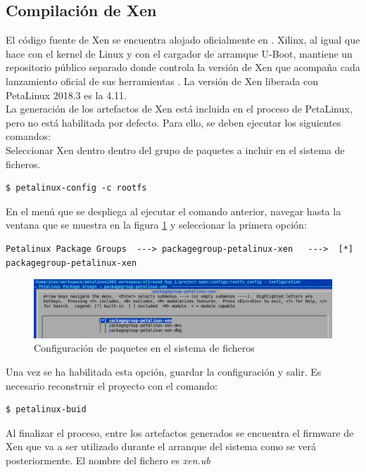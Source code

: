 \subsection{Compilación de Xen} \label{xen_compilacion}

El código fuente de Xen se encuentra alojado oficialmente en \cite{xen_source}. Xilinx, al igual que hace con el kernel de Linux y con el cargador de arramque U-Boot, mantiene un repositorio público separado donde controla la versión de Xen que acompaña cada lanzamiento oficial de sus herramientas \cite{xen_source_xilinx}. La versión de Xen liberada con PetaLinux 2018.3 es la 4.11.\\
La generación de los artefactos de Xen está incluida en el proceso de PetaLinux, pero no está habilitada por defecto. Para ello, se deben ejecutar los siguientes comandos:\\
Seleccionar Xen dentro dentro del grupo de paquetes a incluir en el sistema de ficheros.
\begin{lstlisting}[style=CStyle]
$ petalinux-config -c rootfs
\end{lstlisting}

En el menú que se despliega al ejecutar el comando anterior, navegar hasta la ventana que se muestra en la figura \ref{fig:xen_menuconfig_1} y seleccionar la primera opción:
\begin{lstlisting}[style=CStyle]
Petalinux Package Groups  ---> packagegroup-petalinux-xen   --->  [*] packagegroup-petalinux-xen
\end{lstlisting}

\begin{figure}[!h]
  \centering
  \includegraphics[width=1.0\textwidth]{recursos/petalinux_xen_1.png}
  \caption{Configuración de paquetes en el sistema de ficheros}
  \label{fig:xen_menuconfig_1}
\end{figure}

Una vez se ha habilitada esta opción, guardar la configuración y salir. Es necesario reconstruir el proyecto con el comando:
\begin{lstlisting}[style=CStyle]
$ petalinux-buid
\end{lstlisting}

Al finalizar el proceso, entre los artefactos generados se encuentra el firmware de Xen que va a ser utilizado durante el arranque del sistema como se verá posteriormente. El nombre del fichero es \textit{xen.ub}

